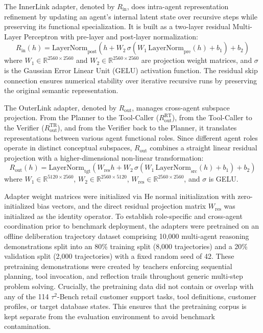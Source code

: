 \documentclass[a4paper, 12pt]{report}
\begin{document}
The InnerLink adapter, denoted by $R_{\text{in}}$, does intra-agent representation refinement by updating an agent's internal latent state over recursive steps while preserving its functional specialization. It is built as a two-layer residual Multi-Layer Perceptron with pre-layer and post-layer normalization:
\begin{equation}
    R_{\text{in}}(h) = \text{LayerNorm}_{\text{post}}\left( h + W_2 \, \sigma\left( W_1 \, \text{LayerNorm}_{\text{pre}}(h) + b_1 \right) + b_2 \right)
\end{equation}
where $W_1 \in \mathbb{R}^{2560 \times 2560}$ and $W_2 \in \mathbb{R}^{2560 \times 2560}$ are projection weight matrices, and $\sigma$ is the Gaussian Error Linear Unit (GELU) activation function. The residual skip connection ensures numerical stability over iterative recursive runs by preserving the original semantic representation.

The OuterLink adapter, denoted by $R_{\text{out}}$, manages cross-agent subspace projection. From the Planner to the Tool-Caller ($R_{\text{out}}^{\text{RT}}$), from the Tool-Caller to the Verifier ($R_{\text{out}}^{\text{TR}}$), and from the Verifier back to the Planner, it translates representations between various agent functional roles. Since different agent roles operate in distinct conceptual subspaces, $R_{\text{out}}$ combines a straight linear residual projection with a higher-dimensional non-linear transformation:
\begin{equation}
    R_{\text{out}}(h) = \text{LayerNorm}_{\text{tgt}}\left( W_{\text{res}} h + W_2 \, \sigma\left( W_1 \, \text{LayerNorm}_{\text{src}}(h) + b_1 \right) + b_2 \right)
\end{equation}
where $W_1 \in \mathbb{R}^{5120 \times 2560}$, $W_2 \in \mathbb{R}^{2560 \times 5120}$, $W_{\text{res}} \in \mathbb{R}^{2560 \times 2560}$, and $\sigma$ is GELU.

Adapter weight matrices were initialized via He normal initialization with zero-initialized bias vectors, and the direct residual projection matrix $W_{\text{res}}$ was initialized as the identity operator. To establish role-specific and cross-agent coordination prior to benchmark deployment, the adapters were pretrained on an offline deliberation trajectory dataset comprising 10,000 multi-agent reasoning demonstrations split into an 80\% training split (8,000 trajectories) and a 20\% validation split (2,000 trajectories) with a fixed random seed of 42. These pretraining demonstrations were created by teachers enforcing sequential planning, tool invocation, and reflection trails throughout generic multi-step problem solving. Crucially, the pretraining data did not contain or overlap with any of the 114 $\tau^2$-Bench retail customer support tasks, tool definitions, customer profiles, or target database states. This ensures that the pretraining corpus is kept separate from the evaluation environment to avoid benchmark contamination.
\end{document}
